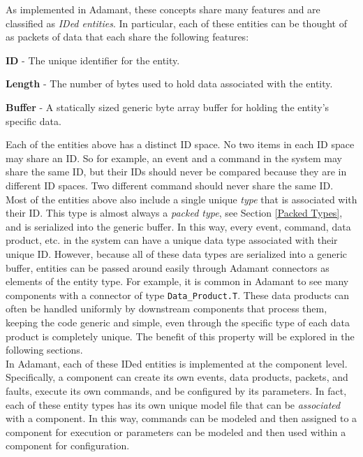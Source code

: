 As implemented in Adamant, these concepts share many features and are classified as \textit{IDed entities}. In particular, each of these entities can be thought of as packets of data that each share the following features: 

\vspace{5mm} %
\begin{spaceditemize}
  \item \textbf{ID} - The unique identifier for the entity.
  \item \textbf{Length} - The number of bytes used to hold data associated with the entity.
  \item \textbf{Buffer} - A statically sized generic byte array buffer for holding the entity's specific data.
\end{spaceditemize}
\vspace{5mm} %

Each of the entities above has a distinct ID space. No two items in each ID space may share an ID. So for example, an event and a command in the system may share the same ID, but their IDs should never be compared because they are in different ID spaces. Two different command should never share the same ID. \\

Most of the entities above also include a single unique \textit{type} that is associated with their ID. This type is almost always a \textit{packed type}, see Section \ref{Packed Types}, and is serialized into the generic buffer. In this way, every event, command, data product, etc. in the system can have a unique data type associated with their unique ID. However, because all of these data types are serialized into a generic buffer, entities can be passed around easily through Adamant connectors as elements of the entity type. For example, it is common in Adamant to see many components with a connector of type \texttt{Data\_Product.T}. These data products can often be handled uniformly by downstream components that process them, keeping the code generic and simple, even through the specific type of each data product is completely unique. The benefit of this property will be explored in the following sections. \\

In Adamant, each of these IDed entities is implemented at the component level. Specifically, a component can create its own events, data products, packets, and faults, execute its own commands, and be configured by its parameters. In fact, each of these entity types has its own unique model file that can be \textit{associated} with a component. In this way, commands can be modeled and then assigned to a component for execution or parameters can be modeled and then used within a component for configuration. \\

